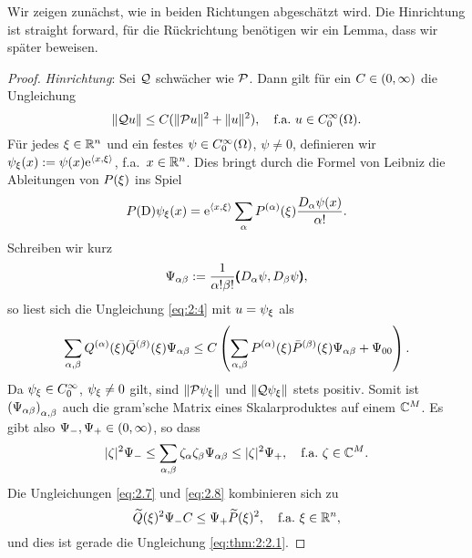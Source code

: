 Wir zeigen zunächst, wie in beiden Richtungen abgeschätzt wird.
Die Hinrichtung ist straight forward,
für die Rückrichtung benötigen wir ein Lemma,
dass wir später beweisen.

\begin{proof}
{\em Hinrichtung}:
Sei $\mathcal Q$ schwächer wie $\mathcal P$.
Dann gilt für ein $C\in(0,\infty)$ die Ungleichung
\begin{equation}\label{eq:2:4}
\lVert\mathcal Q u\rVert\leq C(\lVert\mathcal P u\rVert^2+\lVert u\rVert^2),\quad\text{f.a.}~u\in C^\infty_0(\Omega).
\end{equation}
Für jedes $\xi\in\mathbb R^n$ und ein festes $\psi\in C^\infty_0(\Omega)$, $\psi\neq0$,
definieren wir $\psi_\xi(x):=\psi(x)\mathrm e^{\langle x,\xi\rangle}$, f.a.~$x\in\mathbb R^n$.
Dies bringt durch die Formel von Leibniz die Ableitungen von $P(\xi)$ ins Spiel
\begin{equation}\label{eq:2.5}
P(\mathrm D)\psi_\xi(x)=\mathrm e^{\langle x,\xi\rangle}\sum_\alpha P^{(\alpha)}(\xi)\frac{D_\alpha\psi(x)}{\alpha!}.
\end{equation}
Schreiben wir kurz
\begin{equation}\label{eq:2.6}
\Psi_{\alpha\beta}:=\frac1{\alpha!\beta!}\pmb(D_\alpha\psi,D_\beta\psi\pmb),
\end{equation}
so liest sich die Ungleichung \eqref{eq:2:4} mit $u=\psi_\xi$ als
\begin{equation}\label{eq:2.7}
\sum_{\alpha,\beta}Q^{(\alpha)}(\xi)\bar{Q}^{(\beta)}(\xi)\Psi_{\alpha\beta}
\leq C\left(\sum_{\alpha,\beta}P^{(\alpha)}(\xi)\bar{P}^{(\beta)}(\xi)\Psi_{\alpha\beta}+\Psi_{00}\right).
\end{equation}
Da $\psi_\xi\in C^\infty_0$, $\psi_\xi\neq0$ gilt, sind $\lVert\mathcal P\psi_\xi\rVert$ und $\lVert\mathcal Q\psi_\xi\rVert$ stets positiv.
Somit ist $\left(\Psi_{\alpha\beta}\right)_{\alpha,\beta}$ auch die gram'sche Matrix
eines Skalarproduktes auf einem $\mathbb C^M$.
Es gibt also $\Psi_-,\Psi_+\in(0,\infty)$, so dass
\begin{equation}\label{eq:2.8}
\lvert\zeta\rvert^2\Psi_-\leq\sum_{\alpha,\beta}\zeta_\alpha\zeta_\beta\Psi_{\alpha\beta}\leq\lvert\zeta\rvert^2\Psi_+,
\quad\text{f.a.}~\zeta\in\mathbb C^M.
\end{equation}
Die Ungleichungen \eqref{eq:2.7} und \eqref{eq:2.8} kombinieren sich zu
\begin{equation}\label{eq:2.9}
\widetilde{Q}(\xi)^2\Psi_-C\leq\Psi_+\widetilde{P}(\xi)^2,
\quad\text{f.a.}~\xi\in\mathbb R^n,
\end{equation}
und dies ist gerade die Ungleichung \eqref{eq:thm:2:2.1}.


\end{proof}
